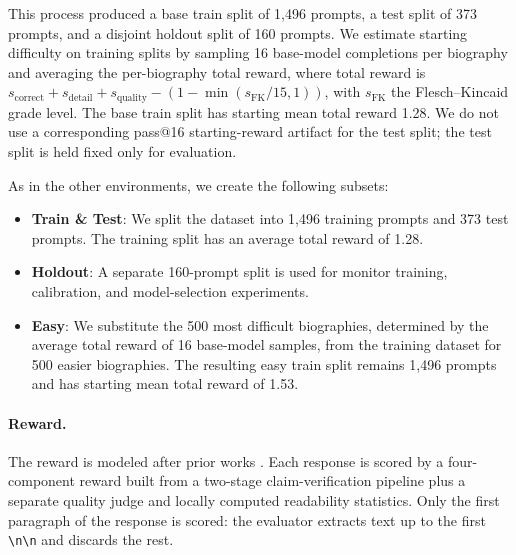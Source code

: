 \documentclass{article}
\begin{document}
This process produced a base train split of 1,496 prompts, a test split of 373 prompts, and a disjoint holdout split of 160 prompts. We estimate starting difficulty on training splits by sampling 16 base-model completions per biography and averaging the per-biography total reward, where total reward is $s_{\text{correct}} + s_{\text{detail}} + s_{\text{quality}} - (1 - \min(s_{\text{FK}}/15, 1))$, with $s_{\text{FK}}$ the Flesch--Kincaid grade level. The base train split has starting mean total reward 1.28. We do not use a corresponding pass@16 starting-reward artifact for the test split; the test split is held fixed only for evaluation.

As in the other environments, we create the following subsets:
\begin{itemize}
    \item \textbf{Train \& Test}: We split the dataset into 1,496 training prompts and 373 test prompts. The training split has an average total reward of 1.28.
    \item \textbf{Holdout}: A separate 160-prompt split is used for monitor training, calibration, and model-selection experiments.
    \item \textbf{Easy}: We substitute the 500 most difficult biographies, determined by the average total reward of 16 base-model samples, from the training dataset for 500 easier biographies. The resulting easy train split remains 1,496 prompts and has starting mean total reward of 1.53.
\end{itemize}

\paragraph{Reward.} The reward is modeled after prior works \citep{song2024veriscore,min2023factscore,li2025dualfact}. Each response is scored by a four-component reward built from a two-stage claim-verification pipeline plus a separate quality judge and locally computed readability statistics. Only the first paragraph of the response is scored: the evaluator extracts text up to the first \texttt{\textbackslash n\textbackslash n} and discards the rest.
\end{document}
